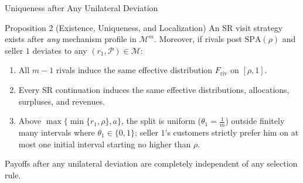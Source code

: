 \documentclass[11pt,aspectratio=169]{beamer}
\newcommand{\SPA}{\mathrm{SPA}}
\begin{document}
\begin{frame}{Uniqueness after Any Unilateral Deviation}
\begin{block}{Proposition 2 (Existence, Uniqueness, and Localization)}
An SR visit strategy exists after \emph{any} mechanism profile in $\mathcal M^m$. Moreover, if rivals post $\SPA(\rho)$ and seller $1$ deviates to any $(r_1,\mathcal P)\in\mathcal M$:
\begin{enumerate}
\item All $m-1$ rivals induce the same effective distribution $F_{\mathrm{riv}}$ on $[\rho,1]$.
\item Every SR continuation induces the same effective distributions, allocations, surpluses, and revenues.
\item Above $\max\{\min\{r_1,\rho\},a\}$, the split is uniform ($\theta_1=\frac1m$) outside finitely many intervals where $\theta_1\in\{0,1\}$; seller $1$'s customers strictly prefer him on at most one initial interval starting no higher than $\rho$.
\end{enumerate}
\end{block}

\medskip{}
Payoffs after any unilateral deviation are completely independent of any selection rule.
\end{frame}
\end{document}

